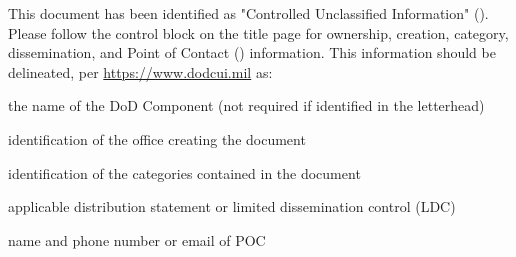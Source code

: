
This document has been identified as "Controlled Unclassified Information" (\CUI).
Please follow the control block on the title page for ownership, creation, category, dissemination, and Point of Contact (\POC) information.
This information should be delineated, per \url{https://www.dodcui.mil} as:
\begin{description}[itemindent=5pt,topsep=0pt,itemsep=0pt,partopsep=0pt, parsep=0pt]
	\item[Owner] the name of the DoD Component (not required if identified in the letterhead)
	\item[Creator] identification of the office creating the document
	\item[Category] identification of the categories contained in the document
	\item[Dissemination]applicable distribution statement or limited dissemination control (LDC)
	\item[\POC]name and phone number or email of POC
\end{description}
